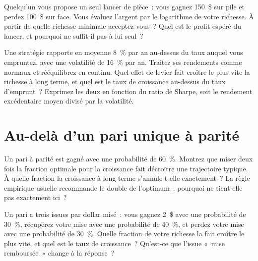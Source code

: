 \begin{question}\label{iq:iv2:betting-and-kelly:9}
Quelqu'un vous propose un seul lancer de pièce~: vous gagnez 150~\$ sur pile et perdez 100~\$ sur face. Vous évaluez l'argent par le logarithme de votre richesse. À partir de quelle richesse minimale acceptez-vous~? Quel est le profit espéré du lancer, et pourquoi ne suffit-il pas à lui seul~?
\end{question}

\begin{question}\label{iq:iv2:betting-and-kelly:10}
Une stratégie rapporte en moyenne 8~\% par an au-dessus du taux auquel vous empruntez, avec une volatilité de 16~\% par an. Traitez ses rendements comme normaux et rééquilibrez en continu. Quel effet de levier fait croître le plus vite la richesse à long terme, et quel est le taux de croissance au-dessus du taux d'emprunt~? Exprimez les deux en fonction du ratio de Sharpe, soit le rendement excédentaire moyen divisé par la volatilité.
\end{question}

\section{Au-delà d'un pari unique à parité}

\begin{question}\label{iq:iv2:betting-and-kelly:11}
Un pari à parité est gagné avec une probabilité de 60~\%. Montrez que miser deux fois la fraction optimale pour la croissance fait décroître une trajectoire typique. À quelle fraction la croissance à long terme s'annule-t-elle exactement~? La règle empirique usuelle recommande le double de l'optimum~: pourquoi ne tient-elle pas exactement ici~?
\end{question}

\begin{question}\label{iq:iv2:betting-and-kelly:12}
Un pari a trois issues par dollar misé~: vous gagnez 2~\$ avec une probabilité de 30~\%, récupérez votre mise avec une probabilité de 40~\%, et perdez votre mise avec une probabilité de 30~\%. Quelle fraction de votre richesse la fait croître le plus vite, et quel est le taux de croissance~? Qu'est-ce que l'issue «~mise remboursée~» change à la réponse~?
\end{question}

